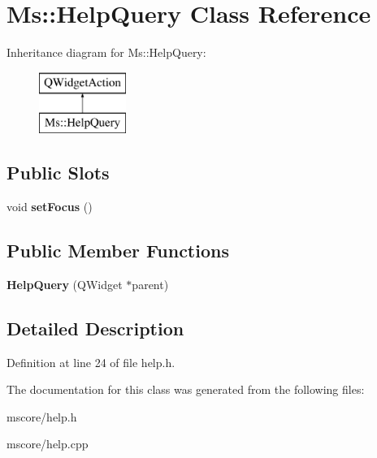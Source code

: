 \hypertarget{class_ms_1_1_help_query}{}\section{Ms\+:\+:Help\+Query Class Reference}
\label{class_ms_1_1_help_query}
Inheritance diagram for Ms\+:\+:Help\+Query\+:\begin{figure}[H]
\begin{center}
\leavevmode
\includegraphics[height=2.000000cm]{class_ms_1_1_help_query}
\end{center}
\end{figure}
\subsection*{Public Slots}
\begin{DoxyCompactItemize}
\item 
\mbox{\label{class_ms_1_1_help_query_a35cb2bd535e190cc62848e468f2d9942}} 
void {\bfseries set\+Focus} ()
\end{DoxyCompactItemize}
\subsection*{Public Member Functions}
\begin{DoxyCompactItemize}
\item 
\mbox{\label{class_ms_1_1_help_query_a9bd5a487def31388dae88e3e60a166f3}} 
{\bfseries Help\+Query} (Q\+Widget $\ast$parent)
\end{DoxyCompactItemize}


\subsection{Detailed Description}


Definition at line 24 of file help.\+h.



The documentation for this class was generated from the following files\+:\begin{DoxyCompactItemize}
\item 
mscore/help.\+h\item 
mscore/help.\+cpp\end{DoxyCompactItemize}

